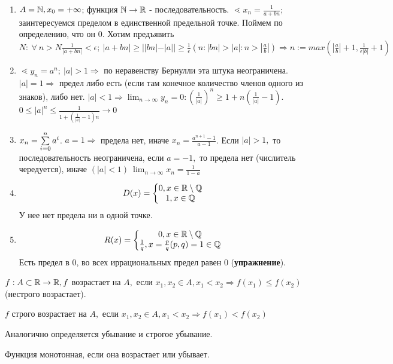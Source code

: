 \documentclass[12pt]{report}
\begin{document}
\begin{ex}
\begin{enumerate}
\item
$A = \mathbb{N}, x_0 = +\infty$; функция $\mathbb{N} \to \mathbb{R}$ - последовательность. $\lessdot x_n = \frac{1}{a + bn}$; заинтересуемся пределом в единственной предельной точке. Поймем по определению, что он $0$. Хотим предъявить $N: ~\forall ~n > N \frac{1}{|a + bn|} < \epsilon; ~|a + bn| \ge ||bn| - |a|| \ge \frac{1}{\epsilon} (n: |bn| > |a|: n > |\frac{a}{b}|) \Rightarrow n := max(|\frac{a}{b}| + 1, \frac{1}{\epsilon |b|} + 1)$
\item
$\lessdot y_n = a^n; ~|a| > 1 \Rightarrow$ по неравенству Бернулли эта штука неограничена. $|a| = 1 \Rightarrow$ предел либо есть (если там конечное количество членов одного из знаков), либо нет. $|a| < 1 \Rightarrow \lim_{n \to \infty}{y_n} = 0: \left(\frac{1}{|a|}\right)^n \ge 1 + n\left(\frac{1}{|a|} - 1\right)$. $0 \le |a|^n \le \frac{1}{1 + \left(\frac{1}{|a|} - 1\right)n} \to 0$
\item
$x_n = \sum\limits_{i = 0}^n{a^i}$. $a = 1 \Rightarrow$ предела нет, иначе $x_n = \frac{a^{n + 1} - 1}{a - 1}$. Если $|a| > 1,$ то последовательность неограничена, если $a = -1,$ то предела нет (числитель чередуется), иначе $(|a| < 1) ~\lim_{n \to \infty}{x_n} = \frac{1}{1 - a}$
\item
$$D(x) = \left\{
\begin{matrix}
0, x \in \mathbb{R}\setminus \mathbb{Q}\\
1, x \in \mathbb{Q}
\end{matrix}\right.
$$
У нее нет предела ни в одной точке.

\item
$$R(x) = \left\{
\begin{matrix}
0, x \in \mathbb{R}\setminus \mathbb{Q}\\
\frac{1}{q}, x = \frac{p}{q} (p, q) = 1 \in \mathbb{Q}
\end{matrix}\right.
$$
Есть предел в $0$, во всех иррациональных предел равен $0$ ({\bfseries упражнение}).
\end{enumerate}
\end{ex}

\begin{defn}
$f: A \subset \mathbb{R} \to \mathbb{R}, f$ возрастает на $A,$ если $x_1, x_2 \in A, x_1 < x_2 \Rightarrow f(x_1) \le f(x_2)$ (нестрого возрастает).

$f$ строго возрастает на $A,$ если $x_1, x_2 \in A, x_1 < x_2 \Rightarrow f(x_1) < f(x_2)$

Аналогично определяется убывание и строгое убывание.

Функция монотонная, если она возрастает или убывает.
\end{defn}
\end{document}

